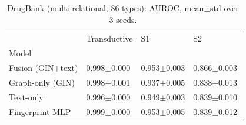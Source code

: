 \begin{table}[t]
\caption{DrugBank (multi-relational, 86 types): AUROC, mean$\pm$std over 3 seeds.}
\label{tab:drugbank-auroc}
\begin{tabular}{llll}
\toprule
 & Transductive & S1 & S2 \\
Model &  &  &  \\
\midrule
Fusion (GIN+text) & 0.998$\pm$0.000 & 0.953$\pm$0.003 & 0.866$\pm$0.003 \\
Graph-only (GIN) & 0.998$\pm$0.001 & 0.937$\pm$0.005 & 0.838$\pm$0.013 \\
Text-only & 0.996$\pm$0.000 & 0.949$\pm$0.003 & 0.839$\pm$0.010 \\
Fingerprint-MLP & 0.999$\pm$0.000 & 0.953$\pm$0.005 & 0.839$\pm$0.012 \\
\bottomrule
\end{tabular}
\end{table}
